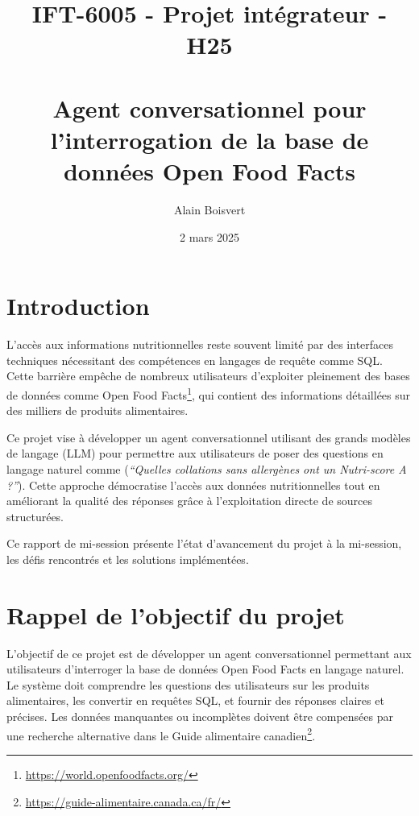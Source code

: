 \documentclass[a4paper,11pt]{article}
\title{IFT-6005 - Projet intégrateur - H25 \\ ~ \\ Agent conversationnel pour l'interrogation de la base de données Open Food Facts}
\author{Alain Boisvert}
\date{2 mars 2025}
\begin{document}

\newpage

\tableofcontents
\newpage

\section{Introduction}  
\label{sec:probleme}

L'accès aux informations nutritionnelles reste souvent limité par des interfaces techniques
nécessitant des compétences en langages de requête comme SQL. Cette barrière empêche de nombreux
utilisateurs d'exploiter pleinement des bases de données 
comme Open Food Facts\footnote{\url{https://world.openfoodfacts.org/}}, 
qui contient des informations détaillées sur des milliers de produits alimentaires. 

Ce projet vise à développer un agent conversationnel utilisant des grands modèles de langage (LLM) 
pour permettre aux utilisateurs de poser des questions en langage naturel 
comme (\textit{\enquote{Quelles collations sans allergènes ont un Nutri-score A ?}}). 
Cette approche démocratise l'accès aux données nutritionnelles tout en améliorant la qualité
des réponses grâce à l'exploitation directe de sources structurées. 

Ce rapport de mi-session présente l'état d'avancement du projet à la mi-session, les défis rencontrés et les solutions implémentées.


\section{Rappel de l'objectif du projet}
\label{sec:revue}

L'objectif de ce projet est de développer un agent conversationnel permettant aux utilisateurs 
d'interroger la base de données Open Food Facts en langage naturel. Le système doit comprendre les 
questions des utilisateurs sur les produits alimentaires, les convertir en requêtes SQL, et fournir
des réponses claires et précises. Les données manquantes ou incomplètes doivent être compensées 
par une recherche alternative 
dans le Guide alimentaire canadien\footnote{\url{https://guide-alimentaire.canada.ca/fr/}}.
\end{document}
